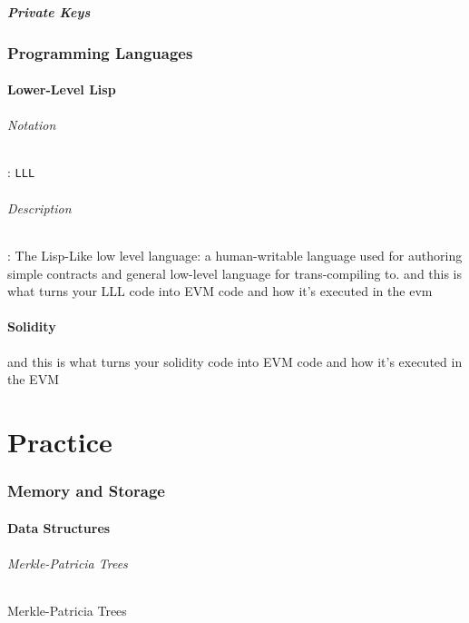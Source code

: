 \documentclass[10pt,a4paper,leqno,bibliography=totoc]{scrartcl}
\newenvironment{alphafootnotes}
{\par\edef\savedfootnotenumber{\number\value{footnote}}
\renewcommand{\thefootnote}{\alph{footnote}}
\setcounter{footnote}{0}}
{\par\setcounter{footnote}{\savedfootnotenumber}}
\begin{document}
\begin{alphafootnotes}
\begin{multicols*}{2}
			\subsubsection{Private Keys}

	\section{Programming Languages}

		\subsection{Lower-Level Lisp}
			\paragraph{Notation}: \texttt{LLL}
			\paragraph{Description}: The Lisp-Like low level language: a human-writable language used for authoring simple contracts and general low-level language for trans-compiling to. 			and this is what turns your LLL code into EVM code and how it's executed in the evm
	
		\subsection{Solidity}
			and this is what turns your solidity code into EVM code and how it's executed in the EVM

\clearpage
\part{Practice}

	\section{Memory and Storage}
			
		\subsection{Data Structures}

				\paragraph{Merkle-Patricia Trees}
					Merkle-Patricia Trees
			

\end{multicols*}
\end{alphafootnotes}
\end{document}
